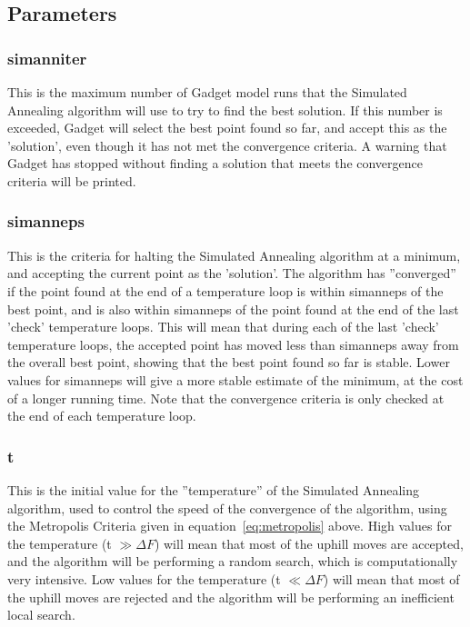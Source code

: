 \documentclass [a4paper, 10pt]{book}
\begin{document}
\subsection{Parameters}\label{subsec:simannpar}
\subsubsection{simanniter}
This is the maximum number of Gadget model runs that the Simulated Annealing algorithm will use to try to find the best solution.  If this number is exceeded, Gadget will select the best point found so far, and accept this as the 'solution', even though it has not met the convergence criteria.  A warning that Gadget has stopped without finding a solution that meets the convergence criteria will be printed.

\subsubsection{simanneps}
This is the criteria for halting the Simulated Annealing algorithm at a minimum, and accepting the current point as the 'solution'.  The algorithm has ''converged'' if the point found at the end of a temperature loop is within simanneps of the best point, and is also within simanneps of the point found at the end of the last 'check' temperature loops.  This will mean that during each of the last 'check' temperature loops, the accepted point has moved less than simanneps away from the overall best point, showing that the best point found so far is stable.  Lower values for simanneps will give a more stable estimate of the minimum, at the cost of a longer running time.  Note that the convergence criteria is only checked at the end of each temperature loop.

\subsubsection{t}
This is the initial value for the ''temperature'' of the Simulated Annealing algorithm, used to control the speed of the convergence of the algorithm, using the Metropolis Criteria given in equation~\ref{eq:metropolis} above.  High values for the temperature (t $\gg \Delta F$) will mean that most of the uphill moves are accepted, and the algorithm will be performing a random search, which is computationally very intensive.  Low values for the temperature (t $\ll \Delta F$) will mean that most of the uphill moves are rejected and the algorithm will be performing an inefficient local search.
\end{document}
